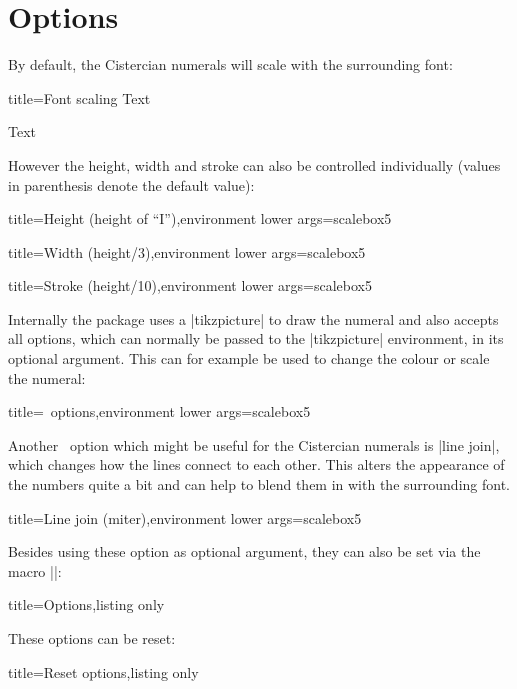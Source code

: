\documentclass{scrartcl}
\begin{document}
\section{Options}

By default, the Cistercian numerals will scale with the surrounding font:
\begin{tcblisting}{title={Font scaling}}
 Text

\Huge {} Text
\end{tcblisting}

However the height, width and stroke can also be controlled individually (values in parenthesis denote the default value):
\begin{tcblisting}{title={Height (height of ``I'')},environment lower args={scalebox}{5}}
\end{tcblisting}
\begin{tcblisting}{title={Width (height/3)},environment lower args={scalebox}{5}}
\end{tcblisting}
\begin{tcblisting}{title={Stroke (height/10)},environment lower args={scalebox}{5}}
\end{tcblisting}

Internally the package uses a \saminline|tikzpicture| to draw the numeral and also accepts all options, which can normally be passed to the \saminline|tikzpicture| environment, in its optional argument. This can for example be used to change the colour or scale the numeral:
\begin{tcblisting}{title={\TikZ\ options},environment lower args={scalebox}{5}}
\end{tcblisting}

Another \TikZ\ option which might be useful for the Cistercian numerals is \saminline|line join|, which changes how the lines connect to each other. This alters the appearance of the numbers quite a bit and can help to blend them in with the surrounding font.
\begin{tcblisting}{title={Line join (miter)},environment lower args={scalebox}{5}}
\end{tcblisting}

Besides using these option as optional argument, they can also be set via the macro \saminline|\cistercianset|:
\begin{tcblisting}{title={Options},listing only}
\end{tcblisting}

These options can be reset:
\begin{tcblisting}{title={Reset options},listing only}
\cistercianreset
\end{tcblisting}
\end{document}
